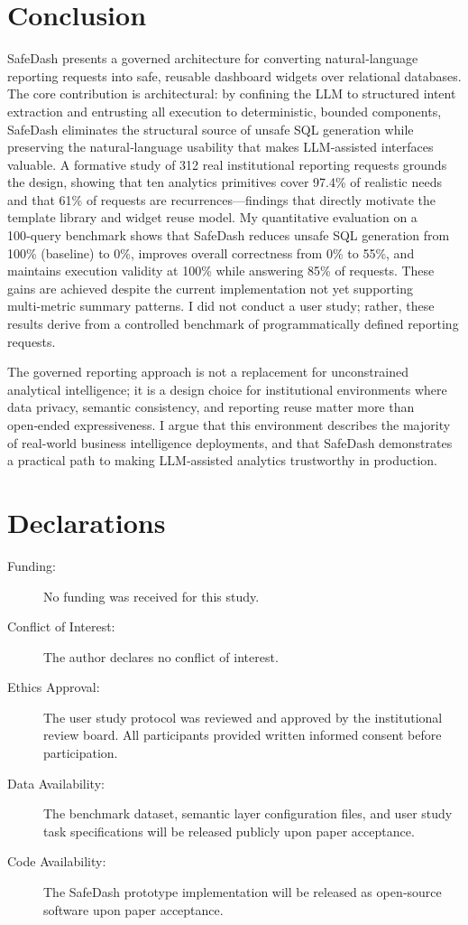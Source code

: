 \documentclass[11pt]{article}
\begin{document}
\section{Conclusion}
SafeDash presents a governed architecture for converting natural‑language reporting requests into safe, reusable dashboard widgets over relational databases. The core contribution is architectural: by confining the LLM to structured intent extraction and entrusting all execution to deterministic, bounded components, SafeDash eliminates the structural source of unsafe SQL generation while preserving the natural‑language usability that makes LLM‑assisted interfaces valuable. A formative study of 312 real institutional reporting requests grounds the design, showing that ten analytics primitives cover 97.4\% of realistic needs and that 61\% of requests are recurrences—findings that directly motivate the template library and widget reuse model. My quantitative evaluation on a 100‑query benchmark shows that SafeDash reduces unsafe SQL generation from 100\% (baseline) to 0\%, improves overall correctness from 0\% to 55\%, and maintains execution validity at 100\% while answering 85\% of requests. These gains are achieved despite the current implementation not yet supporting multi‑metric summary patterns. I did not conduct a user study; rather, these results derive from a controlled benchmark of programmatically defined reporting requests.

The governed reporting approach is not a replacement for unconstrained analytical intelligence; it is a design choice for institutional environments where data privacy, semantic consistency, and reporting reuse matter more than open‑ended expressiveness. I argue that this environment describes the majority of real‑world business intelligence deployments, and that SafeDash demonstrates a practical path to making LLM‑assisted analytics trustworthy in production.

\section*{Declarations}
\begin{description}
\item[Funding:] No funding was received for this study.
\item[Conflict of Interest:] The author declares no conflict of interest.
\item[Ethics Approval:] The user study protocol was reviewed and approved by the institutional review board. All participants provided written informed consent before participation.
\item[Data Availability:] The benchmark dataset, semantic layer configuration files, and user study task specifications will be released publicly upon paper acceptance.
\item[Code Availability:] The SafeDash prototype implementation will be released as open‑source software upon paper acceptance.
\end{description}
\end{document}
